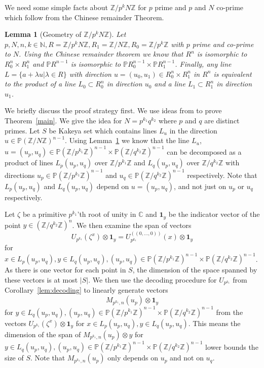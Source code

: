 \documentclass[11pt]{article}
\numberwithin{equation}{section}
\newtheorem{lem}[thm]{Lemma}
\def\Z{{\mathbb{Z}}}
\def\N{{\mathbb{N}}}
\def\C{{\mathbb{C}}}
\def\P{{\mathbb{P}}}
\def\Ind{{\mathbf{1}}}
\begin{document}
We need some simple facts about $\Z/p^kN\Z$ for $p$ prime and $p$ and $N$ co-prime which follow from the Chinese remainder Theorem.

\begin{lem}[Geometry of $\Z/p^kN\Z$]\label{fact:remainder}
Let $p,N,n,k\in \N,R=\Z/p^kN\Z,R_1=\Z/N\Z,R_0=\Z/p^k\Z$ with $p$ prime and co-prime to $N$.  Using the Chinese remainder theorem we know that $R^n$ is isomorphic to $R_0^n\times R_1^n$ and $\P R^{n-1}$ is isomorphic to $\P R_0^{n-1}\times \P R_1^{n-1}$.  Finally, any line $L=\{a+\lambda u| \lambda \in R\}$ with direction $u=(u_0,u_1)\in R_0^{n} \times R_1^{n}$ in $R^n$ is equivalent to the product of a line $L_0\subset R_0^n$ in direction $u_0$ and a line $L_1\subset R_1^n$ in direction $u_1$. 
\end{lem}

We briefly discuss the proof strategy first. We use ideas from \cite{dhar2021proof} to prove Theorem~\ref{main}. We give the idea for $N=p^{k_1}q^{k_2}$ where $p$ and $q$ are distinct primes. Let $S$ be Kakeya set which contains lines $L_u$ in the direction $u\in \P(\Z/N\Z)^{n-1}$. Using Lemma~\ref{fact:remainder} we know that the line $L_u$, $u=(u_p,u_q)\in \P (\Z/p^{k_1}\Z)^{n-1}\times \P (\Z/q^{k_2}\Z)^{n-1}$ can be decomposed as a product of lines $L_p(u_p,u_q)$ over $\Z/p^{k_1}\Z$ and $L_q(u_p,u_q)$ over $\Z/q^{k_2}\Z$  with directions $u_p\in \P (\Z/p^{k_1}\Z)^{n-1}$ and $u_q\in\P (\Z/q^{k_2}\Z)^{n-1}$ respectively. Note that $L_p(u_p,u_q)$ and $L_q(u_p,u_q)$ depend on $u=(u_p,u_q)$, and not just on $u_p$ or $u_q$ respectively. 

Let $\zeta$ be a primitive $p^{k_1}$'th root of unity in $\C$ and $\Ind_y$ be the indicator vector of the point $y\in (\Z/q^{k_2}\Z)^n$. We then examine the span of vectors 
$$U_{p^{k_1}}(\zeta^x)\otimes \Ind_y=U^{((0,\hdots,0))}_{p^{k_1}}(x)\otimes \Ind_y$$
for $x\in L_p(u_p,u_q),y\in L_q(u_p,u_q),(u_p,u_q)\in \P (\Z/p^{k_1}\Z)^{n-1}\times \P (\Z/q^{k_2}\Z)^{n-1}$. As there is one vector for each point in $S$, the dimension of the space spanned by these vectors is at most $|S|$. We then use the decoding procedure for $U_{p^{k_1}}$ from Corollary~\ref{lem:decoding} to linearly generate vectors 
$$M_{p^{k_1},n}(u_p)\otimes \Ind_y$$
for $y\in L_q(u_p,u_q),(u_p,u_q)\in \P (\Z/p^{k_1}\Z)^{n-1}\times \P (\Z/q^{k_2}\Z)^{n-1}$ from the vectors $U_{p^{k_1}}(\zeta^x)\otimes \Ind_y$ for $x\in L_p(u_p,u_q),y\in L_q(u_p,u_q)$. This means the dimension of the span of $M_{p^{k_1},n}(u_p)\otimes y$ for $y\in L_q(u_p,u_q),(u_p,u_q)\in \P (\Z/p^{k_1}\Z)^{n-1}\times \P (\Z/q^{k_2}\Z)^{n-1}$ lower bounds the size of $S$. Note that $M_{p^{k_1},n}(u_p)$ only depends on $u_p$ and not on $u_q$.
\end{document}
